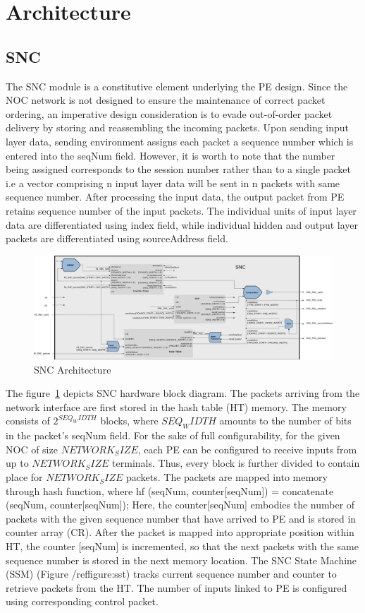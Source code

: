\section{Architecture}
\label{sec:architecture}

\subsection{SNC}
The SNC module is a constitutive element underlying the PE design. Since the NOC network is not
designed to ensure the maintenance of correct packet ordering, an imperative design consideration is to
evade out-of-order packet delivery by storing and reassembling the incoming packets. Upon sending
input layer data, sending environment assigns each packet a sequence number which is entered into the
seqNum field. However, it is worth to note that the number being assigned corresponds to the session
number rather than to a single packet i.e a vector comprising n input layer data will be sent in n packets
with same sequence number. After processing the input data, the output packet from PE retains
sequence number of the input packets. The individual units of input layer data are differentiated using
index field, while individual hidden and output layer packets are differentiated using sourceAddress
field.

\begin{figure}
    \includegraphics[width=\textwidth]{Figures/snc.pdf}
    \caption{SNC Architecture} 
    \label{figure:snc}
\end{figure}

The figure~\ref{figure:snc} depicts SNC hardware block diagram. The packets arriving from the network
interface are first stored in the hash table (HT) memory. The memory consists of $2^{SEQ_WIDTH}$ blocks,
where $SEQ_WIDTH$ amounts to the number of bits in the packet’s seqNum field. For the sake of full
configurability, for the given NOC of size $NETWORK_SIZE$, each PE can be configured to receive inputs
from up to $NETWORK_SIZE$ terminals. Thus, every block is further divided to contain place for
$NETWORK_SIZE$ packets. The packets are mapped into memory through hash function, where
hf (seqNum, counter[seqNum]) = concatenate (seqNum, counter[seqNum]);
Here, the counter[seqNum] embodies the number of packets with the given sequence number that have
arrived to PE and is stored in counter array (CR). After the packet is mapped into appropriate position
within HT, the counter [seqNum] is incremented, so that the next packets with the same sequence
number is stored in the next memory location. The SNC State Machine (SSM) (Figure /ref{figure:sst})
tracks current sequence number and counter to retrieve packets from the HT. The number of inputs
linked to PE is configured using corresponding control packet.

